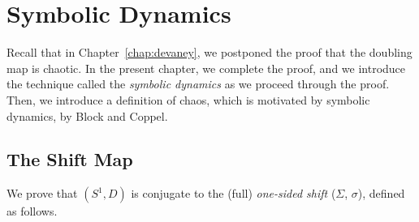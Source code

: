 \documentclass[10pt,twoside]{book}
\begin{document}
\chapter{Symbolic Dynamics}
\label{chap:symbolic}
Recall that in Chapter~\ref{chap:devaney}, we postponed the proof that the doubling map is chaotic.
In the present chapter, we complete the proof, and we introduce the technique called the \textit{symbolic dynamics} as we proceed through the proof.
Then, we introduce a definition of chaos, which is motivated by symbolic dynamics, by Block and Coppel.


\section{The Shift Map}
We prove that $(S^1, D)$ is conjugate to the (full) \textit{one-sided shift} ($\Sigma$, $\sigma$), defined as follows.
\end{document}
